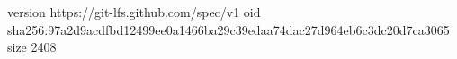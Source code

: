 version https://git-lfs.github.com/spec/v1
oid sha256:97a2d9acdfbd12499ee0a1466ba29c39edaa74dac27d964eb6c3dc20d7ca3065
size 2408

